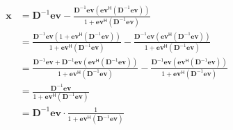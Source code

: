 \documentclass{article}
\begin{document}
\begin{align*}
    \mathbf{x} &= \mathbf{D}^{-1}\mathbf{ev} - \frac{\mathbf{D}^{-1}\mathbf{ev}\left(\mathbf{ev}^{\mathsf{H}}\left( \mathbf{D}^{-1}\mathbf{ev}\right)\right)}{1 + \mathbf{ev}^{\mathsf{H}}\left(\mathbf{D}^{-1}\mathbf{ev}\right)} \\
    &=\frac{\mathbf{D}^{-1}\mathbf{ev}\left(1 + \mathbf{ev}^{\mathsf{H}}\left(\mathbf{D}^{-1}\mathbf{ev}\right)\right)}{1 + \mathbf{ev}^{\mathsf{H}}\left(\mathbf{D}^{-1}\mathbf{ev}\right)} - \frac{\mathbf{D}^{-1}\mathbf{ev}\left(\mathbf{ev}^{\mathsf{H}}\left( \mathbf{D}^{-1}\mathbf{ev}\right)\right)}{1 + \mathbf{ev}^{\mathsf{H}}\left(\mathbf{D}^{-1}\mathbf{ev}\right)} \\
    &=\frac{\mathbf{D}^{-1}\mathbf{ev}+ \mathbf{D}^{-1}\mathbf{ev}\left(\mathbf{ev}^{\mathsf{H}}\left(\mathbf{D}^{-1}\mathbf{ev}\right)\right)}{1 + \mathbf{ev}^{\mathsf{H}}\left(\mathbf{D}^{-1}\mathbf{ev}\right)} - \frac{\mathbf{D}^{-1}\mathbf{ev}\left(\mathbf{ev}^{\mathsf{H}}\left( \mathbf{D}^{-1}\mathbf{ev}\right)\right)}{1 + \mathbf{ev}^{\mathsf{H}}\left(\mathbf{D}^{-1}\mathbf{ev}\right)} \\
    &= \frac{\mathbf{D}^{-1}\mathbf{ev}}{1 + \mathbf{ev}^{\mathsf{H}}\left(\mathbf{D}^{-1}\mathbf{ev}\right)} \\
    &= \mathbf{D}^{-1}\mathbf{ev}\cdot \frac{1}{1 + \mathbf{ev}^{\mathsf{H}}\left(\mathbf{D}^{-1}\mathbf{ev}\right)}
\end{align*}

\pagebreak
\end{document}
